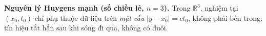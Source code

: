 \textbf{Nguyên lý Huygens mạnh (số chiều lẻ, $n=3$).}
Trong $\mathbb{R}^3$, nghiệm tại $(x_0,t_0)$ chỉ phụ thuộc dữ liệu trên \emph{mặt cầu} $|y-x_0|=ct_0$, không phải bên trong; tín hiệu tắt hẳn sau khi sóng đi qua, không có đuôi.
